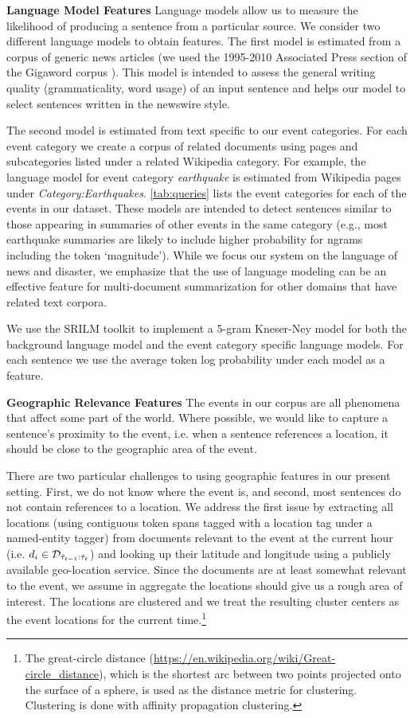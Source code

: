\textbf{Language Model Features}\label{subsubsec:lm} Language models allow us
to measure the likelihood of producing a sentence from a particular source.  We
consider two different language models to obtain features.  The first model is
estimated from a corpus of generic news articles (we used the 1995-2010
Associated Press section of the Gigaword corpus \citep{graff2003english}).
This model is intended to assess the general writing quality (grammaticality,
word usage) of an input sentence and helps our model to select sentences
written in the newswire style.  

The second model is estimated from text specific to our event categories.  For
each event category we create a corpus of related documents using pages and
subcategories listed under a related Wikipedia category. For example, the
language model for event category \textit{earthquake} is estimated from
Wikipedia pages under \emph{Category:Earthquakes}.  \autoref{tab:queries} lists
the event categories for each of the events in our dataset. These models are
intended to detect sentences similar to those appearing in summaries of other
events in the same category (e.g., most earthquake summaries are likely to
include higher probability for ngrams including the token `magnitude').  While
we focus our system on the language of news and disaster, we emphasize that the
use of language modeling can be an effective feature for multi-document
summarization for other domains that have related text corpora.

We use the SRILM toolkit \citep{stolcke2002srilm} to implement a 5-gram
Kneser-Ney model for both the background language model and the event category
specific language models. For each sentence we use the average token log
probability under each model as a feature.

\textbf{Geographic Relevance Features} The events in our corpus are all
phenomena that affect some part of the world.  Where possible, we would like to
capture a sentence's proximity to the event, i.e. when a sentence references a
location, it should be close to the geographic area of the event.

There are two particular challenges to using geographic features in our present
setting. First, we do not know where the event is, and second, most sentences
do not contain references to a location. We address the first issue by
extracting all locations (using contiguous token spans tagged with a location
tag under a named-entity tagger) from documents relevant to the event at the
current hour (i.e. $d_i \in \mathcal{D}_{\hat{\tau}_{{t-1}}:\hat{\tau}_t}$) and looking
up their latitude and longitude using a publicly available geo-location
service.  Since the documents are at least somewhat relevant to the event, we
assume in aggregate the locations should give us a rough area of interest.  The
locations are clustered and we treat the resulting cluster centers as the event
locations for the current time.\footnote{The great-circle distance
(\url{https://en.wikipedia.org/wiki/Great-circle_distance}), which is the
shortest arc between two points projected onto the surface of a sphere, is used
as the distance metric for clustering. Clustering is done with affinity
propagation clustering.}

